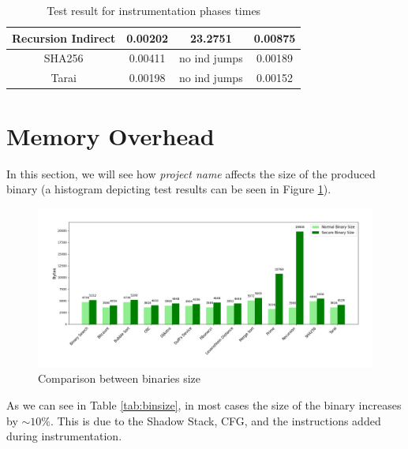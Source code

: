 \begin{table}
\begin{tabular}{|c|c|c|c|}
    \hline
    Recursion Indirect          & 0.00202                      & 23.2751                 & 0.00875                     \\
    \hline
    SHA256                      & 0.00411                      & no ind jumps            & 0.00189                     \\
    \hline
    Tarai                       & 0.00198                      & no ind jumps            & 0.00152                     \\
    \hline
  \end{tabular}
  \caption{Test result for instrumentation phases times}
  \label{tab:othertimes}
\end{table}

\section{Memory Overhead}
\label{sec:pa_memory}

In this section, we will see how \textit{project name} affects the size of the produced
binary (a histogram depicting test results can be seen in Figure
\ref{fig:binsize}).

\begin{figure}[htbp]
  \centering
  \includegraphics[width=.9\linewidth]{images/bin_sizes.png}
  \caption{Comparison between binaries size}
  \label{fig:binsize}
\end{figure}

As we can see in Table \ref{tab:binsize}, in most cases the size of the binary increases
by $\sim 10\%$. This is due to the Shadow Stack, CFG, and the instructions added
during instrumentation.

